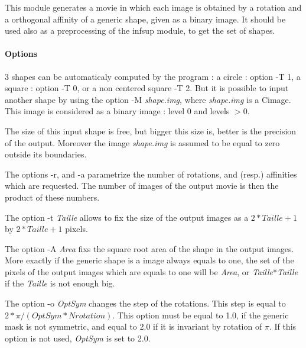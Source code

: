 This module generates a movie in which each image is obtained by a
rotation and a orthogonal affinity of a generic shape, given as a binary
image.
It should be used also as a preprocessing of the infsup module, to get the
set of shapes.

\paragraph{Options}

3 shapes can be automaticaly computed by the program : a circle :
option -T 1, a square : option -T 0, or a non centered square -T 2.
But it is possible to input another shape by using the option -M
{\it shape.img}, where
{\it shape.img} is  a Cimage. This image is considered as a binary image : level 0 and levels $>0$.


The size of this input shape is
free, but bigger this size is, better is the precision of the output.
Moreover the image {\it shape.img} is assumed to be equal to zero
outside its boundaries.

\vspace{1mm}

The options -r, and -a parametrize the number of rotations, and
(resp.) affinities which are requested. The number of images of the
output movie is then the product of these numbers.

\vspace{1mm}


The option -t {\it Taille} allows to fix the size of the output images
as a $2*Taille+1$ by $2*Taille+1$ pixels.

\vspace{1mm}

The option -A {\it Area} fixs the square root area of the shape in the output
images. More exactly if the generic shape is a image always equals to
one, the set of the pixels of the output images which are equals to
one will be {\it Area}, or {\it Taille}*{\it Taille} if the {\it
Taille} is not enough big.

\vspace{1mm}

The option -o {\it OptSym} changes the step of the rotations. This step is 
equal to $2*\pi/(OptSym*Nrotation)$. This option must be equal to 1.0, if the generic mask is not symmetric, and equal to 2.0 if it is invariant by rotation of $\pi$. If this option is not used, {\it OptSym} is set to 2.0.

\vspace{1mm}

